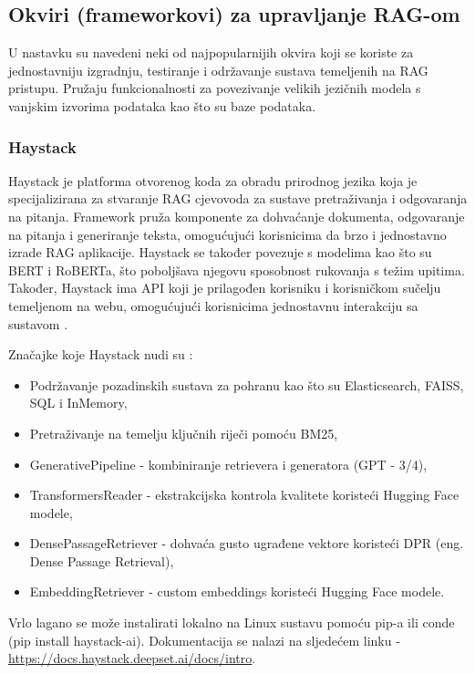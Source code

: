 \documentclass[]{foi}
\begin{document}
\subsection{Okviri (frameworkovi) za upravljanje RAG-om}
U nastavku su navedeni neki od najpopularnijih okvira koji se koriste za jednostavniju izgradnju, testiranje i održavanje sustava temeljenih
na RAG pristupu. Pružaju funkcionalnosti za povezivanje velikih jezičnih modela s vanjskim izvorima podataka kao što su baze podataka.

\subsubsection{Haystack}
Haystack je platforma otvorenog koda za obradu prirodnog jezika koja je specijalizirana za stvaranje RAG cjevovoda za sustave pretraživanja 
i odgovaranja na pitanja. Framework pruža komponente za dohvaćanje dokumenta, odgovaranje na pitanja i generiranje teksta, omogućujući korisnicima
da brzo i jednostavno izrade RAG aplikacije. Haystack se također povezuje s modelima kao što su BERT i RoBERTa, što poboljšava njegovu sposobnost 
rukovanja s težim upitima. Također, Haystack ima API koji je prilagođen korisniku i korisničkom sučelju temeljenom na webu, omogućujući korisnicima
jednostavnu interakciju sa sustavom \cite{novogroder2025ragtools}.

Značajke koje Haystack nudi su \cite{novogroder2025ragtools}:
\begin{itemize}
    \item Podržavanje pozadinskih sustava za pohranu kao što su Elasticsearch, FAISS, SQL i InMemory,
    \item Pretraživanje na temelju ključnih riječi pomoću BM25,
    \item GenerativePipeline - kombiniranje retrievera i generatora (GPT - 3/4),
    \item TransformersReader - ekstrakcijska kontrola kvalitete koristeći Hugging Face modele,
    \item DensePassageRetriever - dohvaća gusto ugrađene vektore koristeći DPR (eng. Dense Passage Retrieval),
    \item EmbeddingRetriever - custom embeddings koristeći Hugging Face modele.
\end{itemize}

Vrlo lagano se može instalirati lokalno na Linux sustavu pomoću pip-a ili conde (pip install haystack-ai). Dokumentacija se nalazi na sljedećem linku - \url{https://docs.haystack.deepset.ai/docs/intro}. 
\end{document}
